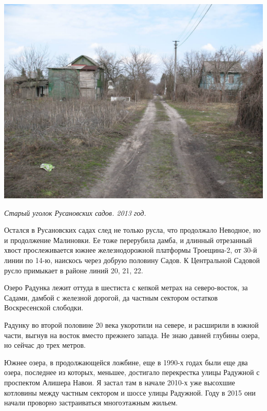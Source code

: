 \newpage

\begin{center}
\includegraphics[width=\linewidth]{chast-gorodki/radujnoe/s_IMG_2485.JPG}

\textit{Старый уголок Русановских садов. 2013 год.}
\end{center}

Остался в Русановских садах след не только русла, что продолжало Неводное, но и продолжение Малиновки. Ее тоже перерубила дамба, и длинный отрезанный хвост прослеживается южнее железнодорожной платформы Троещина-2, от 30-й линии по 14-ю, наискось через добрую половину Садов. К Центральной Садовой русло примыкает в районе линий 20, 21, 22.

Озеро Радунка лежит оттуда в шестиста с кепкой метрах на северо-восток, за Садами, дамбой с железной дорогой, да частным сектором остатков Воскресенской слободки.


Радунку во второй половине 20 века укоротили на севере, и расширили в южной части, выгнув на восток вместо прежнего запада. Не знаю давней глубины озера, но сейчас до трех метров.

Южнее озера, в продолжающейся ложбине, еще в 1990-х годах были еще два озера, последнее из которых, меньшее, достигало перекрестка улицы Радужной с проспектом Алишера Навои. Я застал там в начале 2010-х уже высохшие котловины между частным сектором и шоссе улицы Радужной. Году в 2015 они начали проворно застраиваться многоэтажным жильем.

